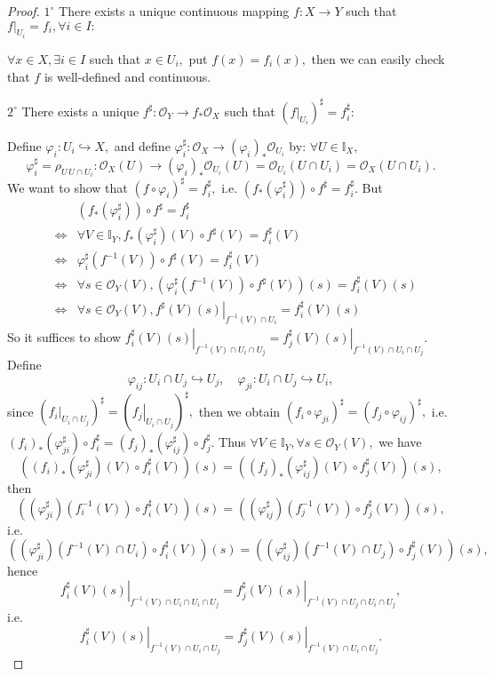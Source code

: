 \begin{proof}
$\mathit{1^{\circ}}$ There exists a unique continuous mapping $f:
X\rightarrow Y$ such that $\left.f\right|_{U_i}=f_i,\forall i\in I:$

$\forall x\in X,\exists i\in I$ such that $x\in U_i,$ put
$f(x)=f_i(x),$ then we can easily check that $f$ is well-defined and
continuous.

$\mathit{2^{\circ}}$ There exists a unique $f^{\sharp}:\mathcal
{O}_Y\rightarrow f_{\ast}\mathcal {O}_X$ such that
$(\left.f\right|_{U_i})^{\sharp}=f_i^{\sharp}:$

Define $\varphi_i:U_i\hookrightarrow X,$ and define
$\varphi_i^{\sharp}:\mathcal {O}_X\rightarrow
(\varphi_i)_{\ast}\mathcal {O}_{U_i}$ by: $\forall
U\in\mathds{I}_X,$
$$\varphi_i^{\sharp}=\rho_{U\,U\cap U_i}:\mathcal {O}_X(U)\rightarrow
(\varphi_i)_{\ast}\mathcal {O}_{U_i}(U)=\mathcal {O}_{U_i}(U\cap
U_i)=\mathcal {O}_{X}(U\cap U_i).$$ We want to show that
$(f\circ\varphi_i)^{\sharp}=f_i^{\sharp},$ i.e.
$(f_{\ast}(\varphi_i^{\sharp}))\circ f^{\sharp}=f_i^{\sharp}.$ But
\begin{eqnarray*}
& & (f_{\ast}(\varphi_i^{\sharp}))\circ f^{\sharp}=f_i^{\sharp}   \\
& \Longleftrightarrow & \forall V\in\mathds{I}_Y,
f_{\ast}(\varphi_i^{\sharp})(V)\circ f^{\sharp}(V)=f_i^{\sharp}(V)\\
& \Longleftrightarrow & \varphi_i^{\sharp}(f^{-1}(V))\circ
f^{\sharp}(V)=f_i^{\sharp}(V)                                     \\
& \Longleftrightarrow & \forall s\in\mathcal {O}_Y(V),
(\varphi_i^{\sharp}(f^{-1}(V))\circ
f^{\sharp}(V))(s)=f_i^{\sharp}(V)(s)                              \\
& \Longleftrightarrow & \forall s\in\mathcal {O}_Y(V),
\left.f^{\sharp}(V)(s)\right|_{f^{-1}(V)\cap U_i}=f_i^{\sharp}(V)(s)
\end{eqnarray*}
So it suffices to show
$\left.f_i^{\sharp}(V)(s)\right|_{f^{-1}(V)\cap U_i\cap U_j} =
\left.f_j^{\sharp}(V)(s)\right|_{f^{-1}(V)\cap U_i\cap U_j}.$ Define
$$\varphi_{ij}: U_i\cap U_j\hookrightarrow U_j,\quad \varphi_{ji}:U_i\cap U_j\hookrightarrow
U_i,$$ since $(\left.f_i\right|_{U_i\cap U_j})^{\sharp} =
(\left.f_j\right|_{U_i\cap U_j})^{\sharp},$ then we obtain
$(f_i\circ\varphi_{ji})^{\sharp}=(f_j\circ\varphi_{ij})^{\sharp},$
i.e. $(f_i)_{\ast}(\varphi_{ji}^{\sharp})\circ f_i^{\sharp}
=(f_j)_{\ast}(\varphi_{ij}^{\sharp})\circ f_j^{\sharp}.$ Thus
$\forall V\in\mathds{I}_Y,\forall s\in\mathcal {O}_Y(V),$ we have
$$((f_i)_{\ast}(\varphi_{ji}^{\sharp})(V)\circ f_i^{\sharp}(V))(s)
=((f_j)_{\ast}(\varphi_{ij}^{\sharp})(V)\circ f_j^{\sharp}(V))(s),$$
then
$$((\varphi_{ji}^{\sharp})(f_i^{-1}(V))\circ f_i^{\sharp}(V))(s)
=((\varphi_{ij}^{\sharp})(f_j^{-1}(V))\circ f_j^{\sharp}(V))(s),$$
i.e.
$$((\varphi_{ji}^{\sharp})(f^{-1}(V)\cap U_i)\circ f_i^{\sharp}(V))(s)
=((\varphi_{ij}^{\sharp})(f^{-1}(V)\cap U_j)\circ
f_j^{\sharp}(V))(s),$$ hence
$$\left.f_i^{\sharp}(V)(s)\right|_{f^{-1}(V)\cap U_i\cap U_i\cap U_j}=
\left.f_j^{\sharp}(V)(s)\right|_{f^{-1}(V)\cap U_j\cap U_i\cap
U_j},$$ i.e.
$$\left.f_i^{\sharp}(V)(s)\right|_{f^{-1}(V)\cap U_i\cap U_j}=
\left.f_j^{\sharp}(V)(s)\right|_{f^{-1}(V)\cap U_i\cap U_j}.$$
\end{proof}
